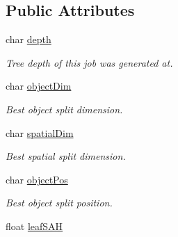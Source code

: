 \subsection*{Public Attributes}
\begin{DoxyCompactItemize}
\item 
char \hyperlink{classembree_1_1_spatial_binning_a99c86e2b94dc1c23e6309860571db996}{depth}
\begin{DoxyCompactList}\small\item\em Tree depth of this job was generated at. \item\end{DoxyCompactList}\item 
\hypertarget{classembree_1_1_spatial_binning_aa3dccdc5ce1318633ebab0d9499f29d4}{
char \hyperlink{classembree_1_1_spatial_binning_aa3dccdc5ce1318633ebab0d9499f29d4}{objectDim}}
\label{classembree_1_1_spatial_binning_aa3dccdc5ce1318633ebab0d9499f29d4}

\begin{DoxyCompactList}\small\item\em Best object split dimension. \item\end{DoxyCompactList}\item 
\hypertarget{classembree_1_1_spatial_binning_a742173419f39f071a1f8e66118ddfb55}{
char \hyperlink{classembree_1_1_spatial_binning_a742173419f39f071a1f8e66118ddfb55}{spatialDim}}
\label{classembree_1_1_spatial_binning_a742173419f39f071a1f8e66118ddfb55}

\begin{DoxyCompactList}\small\item\em Best spatial split dimension. \item\end{DoxyCompactList}\item 
\hypertarget{classembree_1_1_spatial_binning_a66eb2b271c4fc00695644003537de701}{
char \hyperlink{classembree_1_1_spatial_binning_a66eb2b271c4fc00695644003537de701}{objectPos}}
\label{classembree_1_1_spatial_binning_a66eb2b271c4fc00695644003537de701}

\begin{DoxyCompactList}\small\item\em Best object split position. \item\end{DoxyCompactList}\item 
\hypertarget{classembree_1_1_spatial_binning_a1ada2daf6f7b65b4f4b6a9a1ee91846b}{
float \hyperlink{classembree_1_1_spatial_binning_a1ada2daf6f7b65b4f4b6a9a1ee91846b}{leafSAH}}
\label{classembree_1_1_spatial_binning_a1ada2daf6f7b65b4f4b6a9a1ee91846b}


\end{DoxyCompactItemize}
